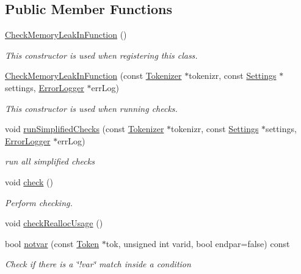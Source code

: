 \subsection*{Public Member Functions}
\begin{DoxyCompactItemize}
\item 
\hyperlink{class_check_memory_leak_in_function_a1430a34dbf750b3515b28924c1c5b288}{Check\-Memory\-Leak\-In\-Function} ()
\begin{DoxyCompactList}\small\item\em This constructor is used when registering this class. \end{DoxyCompactList}\item 
\hyperlink{class_check_memory_leak_in_function_aeb98724805ffb0a866283d2749b771c0}{Check\-Memory\-Leak\-In\-Function} (const \hyperlink{class_tokenizer}{Tokenizer} $\ast$tokenizr, const \hyperlink{class_settings}{Settings} $\ast$settings, \hyperlink{class_error_logger}{Error\-Logger} $\ast$err\-Log)
\begin{DoxyCompactList}\small\item\em This constructor is used when running checks. \end{DoxyCompactList}\item 
void \hyperlink{class_check_memory_leak_in_function_a3796e71d1d94ba6e8440561f30c9116c}{run\-Simplified\-Checks} (const \hyperlink{class_tokenizer}{Tokenizer} $\ast$tokenizr, const \hyperlink{class_settings}{Settings} $\ast$settings, \hyperlink{class_error_logger}{Error\-Logger} $\ast$err\-Log)
\begin{DoxyCompactList}\small\item\em run all simplified checks \end{DoxyCompactList}\item 
void \hyperlink{class_check_memory_leak_in_function_a765744d86a1643b51f89145fa5cd2b80}{check} ()
\begin{DoxyCompactList}\small\item\em Perform checking. \end{DoxyCompactList}\item 
void \hyperlink{class_check_memory_leak_in_function_a3b23fe4d9c6aeeffd3700dde5fe8d837}{check\-Realloc\-Usage} ()
\item 
bool \hyperlink{class_check_memory_leak_in_function_a5a82b2db092deb642b887fd24f4cad8f}{notvar} (const \hyperlink{class_token}{Token} $\ast$tok, unsigned int varid, bool endpar=false) const 
\begin{DoxyCompactList}\small\item\em Check if there is a \char`\"{}!var\char`\"{} match inside a condition \end{DoxyCompactList}\item 

\end{DoxyCompactItemize}
